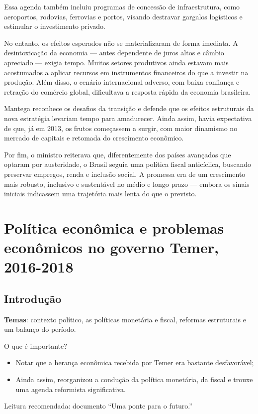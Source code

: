 \documentclass[a4paper,12pt]{article}[abntex2]
\begin{document}
Essa agenda também incluiu programas de concessão de infraestrutura, como aeroportos, rodovias, ferrovias e portos, visando destravar gargalos logísticos e estimular o investimento privado.

No entanto, os efeitos esperados não se materializaram de forma imediata. A desintoxicação da economia --- antes dependente de juros altos e câmbio apreciado --- exigia tempo. Muitos setores produtivos ainda estavam mais acostumados a aplicar recursos em instrumentos financeiros do que a investir na produção. Além disso, o cenário internacional adverso, com baixa confiança e retração do comércio global, dificultava a resposta rápida da economia brasileira.

Mantega reconhece os desafios da transição e defende que os efeitos estruturais da nova estratégia levariam tempo para amadurecer. Ainda assim, havia expectativa de que, já em 2013, os frutos começassem a surgir, com maior dinamismo no mercado de capitais e retomada do crescimento econômico.

Por fim, o ministro reiterava que, diferentemente dos países avançados que optaram por austeridade, o Brasil seguia uma política fiscal anticíclica, buscando preservar empregos, renda e inclusão social. A promessa era de um crescimento mais robusto, inclusivo e sustentável no médio e longo prazo --- embora os sinais iniciais indicassem uma trajetória mais lenta do que o previsto.

\newpage
\section{\textbf{Política econômica e problemas econômicos no governo Temer, 2016-2018}}
\subsection{\textbf{Introdução}}
\textbf{Temas}: contexto político, as políticas monetária e fiscal, reformas estruturais e um balanço do período.

O que é importante?\begin{itemize}
    \item Notar que a herança econômica recebida por Temer era bastante desfavorável;
    \item Ainda assim, reorganizou a condução da política monetária, da fiscal e trouxe uma agenda reformista significativa.
\end{itemize}

Leitura recomendada: documento “Uma ponte para o futuro.”
\end{document}
